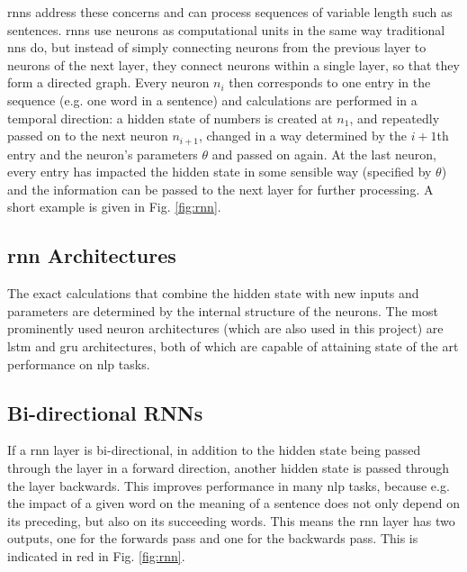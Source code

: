      \Glspl{rnn} address these concerns and can process sequences of variable length such as sentences. \Glspl{rnn} use \glspl{neuron} as computational units in the same way traditional \glspl{nn} do, but instead of simply connecting \glspl{neuron} from the previous layer to \glspl{neuron} of the next layer, they connect \glspl{neuron} within a single layer, so that they form a directed graph. Every neuron $n_i$ then corresponds to one entry in the sequence (e.g. one word in a sentence) and calculations are performed in a temporal direction: a hidden state of numbers is created at $n_1$, and repeatedly passed on to the next \gls{neuron} $n_{i+1}$, changed in a way determined by the $i+1$th entry and the \gls{neuron}'s parameters $\theta$ and passed on again. At the last \gls{neuron}, every entry has impacted the hidden state in some sensible way (specified by $\theta$) and the information can be passed to the next layer for further processing. A short example is given in Fig. \ref{fig:rnn}.
     
    
    \subsection{\gls{rnn} Architectures \label{ssec: rnn architectures}}
    The exact calculations that combine the hidden state with new inputs and parameters are determined by the internal structure of the \glspl{neuron}. The most prominently used \gls{neuron} architectures (which are also used in this project) are \gls{lstm}\cite{hochreiter1997long} and \gls{gru}\cite{chung2014empirical} architectures, both of which are capable of attaining state of the art performance on \gls{nlp} tasks\cite{huang2015bidirectional}.
    
    \subsection{Bi-directional RNNs \label{ssec: bidirectional RNN}}
    If a \gls{rnn} layer is bi-directional, in addition to the hidden state being passed through the layer in a forward direction, another hidden state is passed through the layer backwards. This improves performance in many \gls{nlp} tasks, because e.g.  the impact of a given word on the meaning of a sentence does not only depend on its preceding, but also on its succeeding words. This means the \gls{rnn} layer has two outputs, one for the forwards pass and one for the backwards pass. This is indicated in red in Fig. \ref{fig:rnn}.
    
